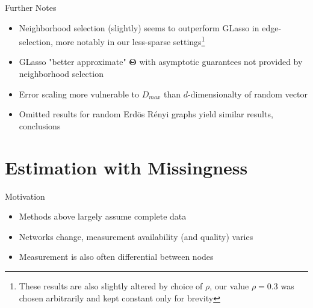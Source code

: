 \documentclass{beamer}
\begin{document}
\begin{frame}{Further Notes}
\begin{itemize}\setlength\itemsep{5mm}
    \item Neighborhood selection (slightly) seems to outperform GLasso in edge-selection, more notably in our less-sparse settings\footnote{These results are also slightly altered by choice of $\rho$, our value $\rho=0.3$ was chosen arbitrarily and kept constant only for brevity}
    \item GLasso "better approximate" $\boldsymbol\Theta$ with asymptotic guarantees not provided by neighborhood selection
    \item Error scaling more vulnerable to $D_{max}$ than $d$-dimensionalty of random vector 
    \item Omitted results for random Erd\"os R\'enyi graphs yield similar results, conclusions 
\end{itemize}    
\end{frame}


\section{Estimation with Missingness}

\begin{frame}{Motivation}
    \begin{itemize}\setlength\itemsep{6mm}
        \item Methods above largely assume complete data%
        \item Networks change, measurement availability (and quality) varies
        \item Measurement is also often differential between nodes 
    \end{itemize}
\end{frame}
\end{document}
